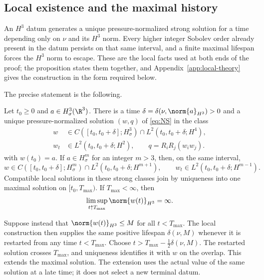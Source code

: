 \subsection{Local existence and the maximal history}

An \(H^3\) datum generates a unique pressure-normalized strong solution for a
time depending only on \(\nu\) and its \(H^3\) norm.  Every higher integer
Sobolev order already present in the datum persists on that same interval,
and a finite maximal lifespan forces the \(H^3\) norm to escape.  These are
the local facts used at both ends of the proof; the
proposition states them together, and Appendix~\ref{app:local-theory} gives
the construction in the form required below.

The precise statement is the following.

\begin{proposition}
\label{prop:maximal-history}
Let \(t_0\ge0\) and \(a\in H^3_\sigma(\R^3)\).  There is a time
\(\delta=\delta(\nu,\norm{a}_{H^3})>0\) and a unique pressure-normalized
solution \((w,q)\) of \eqref{eq:NS} in the class
\begin{equation}
 \begin{aligned}
 w&\in C([t_0,t_0+\delta];H^3_\sigma)
      \cap L^2(t_0,t_0+\delta;H^4),\\
 w_t&\in L^2(t_0,t_0+\delta;H^2),
 \qquad
 q=R_iR_j(w_iw_j).
 \end{aligned}
 \label{eq:local-base-class}
\end{equation}
with \(w(t_0)=a\).  If \(a\in H^m_\sigma\) for an integer \(m>3\), then, on
the same interval,
\begin{equation*}
 w\in C([t_0,t_0+\delta];H^m_\sigma)
   \cap L^2(t_0,t_0+\delta;H^{m+1}),
 \qquad
 w_t\in L^2(t_0,t_0+\delta;H^{m-1}).
\end{equation*}
Compatible local solutions in these strong classes join by
uniqueness into one maximal solution on \([t_0,T_{\max})\).  If
\(T_{\max}<\infty\), then
\begin{equation*}
 \limsup_{t\uparrow T_{\max}}\norm{w(t)}_{H^3}=\infty.
\end{equation*}
\end{proposition}

Suppose instead that
\(\norm{w(t)}_{H^3}\le M\) for all \(t<T_{\max}\).  The local construction
then supplies the same positive lifespan
\(\delta(\nu,M)\) whenever it is restarted from any time \(t<T_{\max}\).
Choose
\(t>T_{\max}-\tfrac12\delta(\nu,M)\).  The restarted solution crosses
\(T_{\max}\), and uniqueness identifies it with \(w\) on the overlap.  This
extends the maximal solution.  The extension uses the actual value of the
same solution at a late time; it does not select a new terminal datum.

